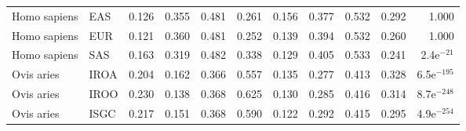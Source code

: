 \begin{longtable}{llrrrrrrrrr}
        Homo sapiens &                       EAS &                              0.126 &                               0.355 &                 0.481 &                 0.261 &                              0.156 &                               0.377 &                 0.532 &                 0.292 &         1.000 \\
        Homo sapiens &                       EUR &                              0.121 &                               0.360 &                 0.481 &                 0.252 &                              0.139 &                               0.394 &                 0.532 &                 0.260 &         1.000 \\
        Homo sapiens &                       SAS &                              0.163 &                               0.319 &                 0.482 &                 0.338 &                              0.129 &                               0.405 &                 0.533 &                 0.241 &  2.4e$^{-21}$ \\
          Ovis aries &                      IROA &                              0.204 &                               0.162 &                 0.366 &                 0.557 &                              0.135 &                               0.277 &                 0.413 &                 0.328 & 6.5e$^{-195}$ \\
          Ovis aries &                      IROO &                              0.230 &                               0.138 &                 0.368 &                 0.625 &                              0.130 &                               0.285 &                 0.416 &                 0.314 & 8.7e$^{-248}$ \\
          Ovis aries &                      ISGC &                              0.217 &                               0.151 &                 0.368 &                 0.590 &                              0.122 &                               0.292 &                 0.415 &                 0.295 & 4.9e$^{-254}$ \\
\end{longtable}
